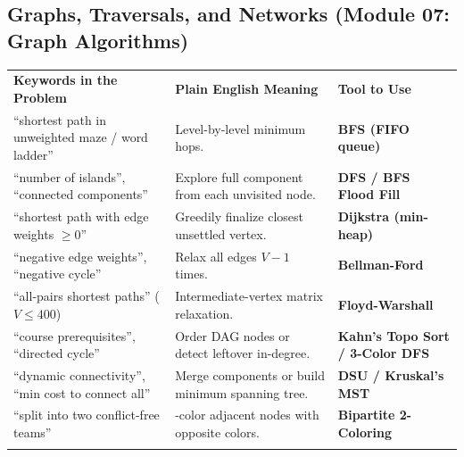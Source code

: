 \documentclass[11pt,a4paper]{article}
\begin{document}
\subsection{Graphs, Traversals, and Networks (Module 07: Graph Algorithms)}
\begingroup\footnotesize{}
\begin{tabularx}{\textwidth}{>{\raggedright\arraybackslash}p{4.4cm} >{\raggedright\arraybackslash}X >{\raggedright\arraybackslash\bfseries}p{4.0cm}}
\arrayrulecolor{primaryblue}\toprule[1.1pt]
\rowcolor{primaryblue!10}
\textcolor{primaryblue}{\textbf{Keywords in the Problem}} & \textcolor{primaryblue}{\textbf{Plain English Meaning}} & \textcolor{primaryblue}{\textbf{Tool to Use}} \\
\arrayrulecolor{codeframe}\midrule[0.6pt]
``shortest path in unweighted maze / word ladder'' & Level-by-level minimum hops. & BFS (FIFO queue) \\
``number of islands'', ``connected components'' & Explore full component from each unvisited node. & DFS / BFS Flood Fill \\
``shortest path with edge weights $\ge 0$'' & Greedily finalize closest unsettled vertex. & Dijkstra (min-heap) \\
``negative edge weights'', ``negative cycle'' & Relax all edges $V - 1$ times. & Bellman-Ford \\
``all-pairs shortest paths'' ($V \le 400$) & Intermediate-vertex matrix relaxation. & Floyd-Warshall \\
``course prerequisites'', ``directed cycle'' & Order DAG nodes or detect leftover in-degree. & Kahn's Topo Sort / 3-Color DFS \\
``dynamic connectivity'', ``min cost to connect all'' & Merge components or build minimum spanning tree. & DSU / Kruskal's MST \\
``split into two conflict-free teams'' & 2-color adjacent nodes with opposite colors. & Bipartite 2-Coloring \\
\arrayrulecolor{primaryblue}\bottomrule[1.1pt]
\end{tabularx}\endgroup
\end{document}

